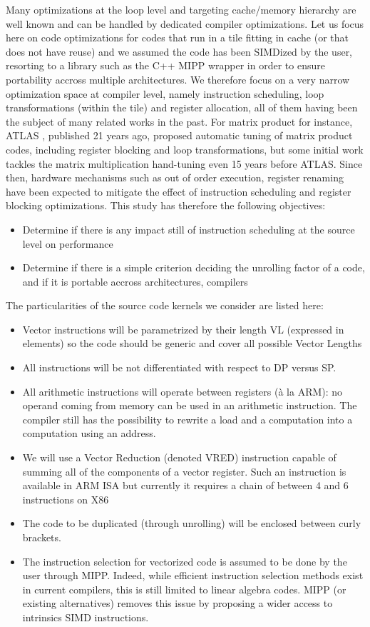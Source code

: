 \documentclass{article}
\begin{document}
Many optimizations at the loop level and targeting cache/memory
hierarchy are well known and can be handled by dedicated compiler
optimizations. Let us focus here on code optimizations for codes that
run in a tile fitting in cache (or that does not have
reuse) and we assumed the code has been SIMDized by the user, resorting to a library such as the C++ MIPP
wrapper \cite{mipp} in order to ensure portability accross multiple architectures. We therefore focus on a very narrow optimization
space at compiler level, namely instruction
scheduling, loop transformations (within the tile) and
register allocation, all of them having been the subject of many related works in the past. For matrix product for instance, ATLAS \cite{atlas}, published 21 years ago, proposed automatic tuning of matrix product codes, including register blocking and loop transformations, but some initial work \cite{JalbyM86} tackles the matrix multiplication hand-tuning even 15 years before ATLAS. Since then, hardware mechanisms such as  out of order execution, register renaming have been expected to mitigate the effect of  instruction scheduling and register blocking  optimizations. This study has therefore the following objectives:
\begin{itemize}
\item Determine if there is any impact still of instruction scheduling at the source level on performance 
\item Determine if there is a simple criterion deciding the unrolling factor of a code, and if it is portable accross architectures, compilers
\end{itemize}


The
particularities of the source code kernels we consider are listed here:
\begin{itemize}
  \item Vector instructions will be parametrized by their length VL (expressed in elements) so the code should be generic and cover all possible Vector Lengths
\item All instructions will be not differentiated with respect to DP versus SP. 
\item All arithmetic instructions will operate between registers (à la ARM): no operand coming from memory can be used in an arithmetic instruction. The compiler still has the possibility to rewrite a load and a computation into a computation using an address. 
\item We will use a Vector Reduction (denoted VRED) instruction capable of summing all of the components of a vector register. Such an instruction is available in ARM ISA but currently it requires a chain of between 4 and 6 instructions on X86
\item The code to be duplicated (through unrolling) will be enclosed between curly brackets. 
\item The instruction selection for vectorized code is assumed to be done by the user through MIPP. Indeed, while efficient instruction selection methods exist in current compilers, this is still limited to linear algebra codes. MIPP (or existing alternatives) removes this issue by proposing a wider access to intrinsics SIMD instructions.
\end{itemize}
\end{document}
